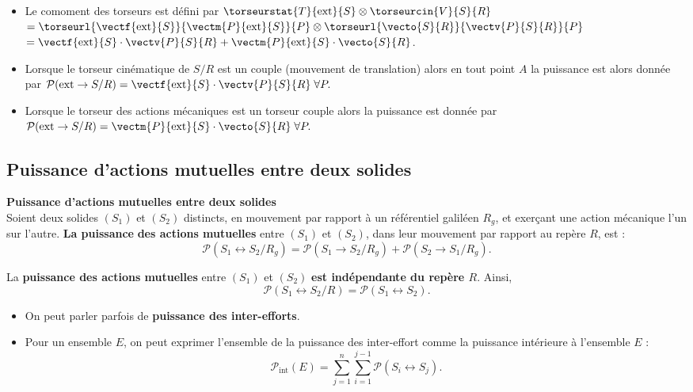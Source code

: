 \begin{rem}%
\begin{itemize}
\item Le comoment des torseurs est défini par 
$\torseurstat{T}{\text{ext}}{S}\otimes \torseurcin{V}{S}{R}$
$=
\torseurl{\vectf{\text{ext}}{S}}{\vectm{P}{\text{ext}}{S}}{P}
\otimes \torseurl{\vecto{S}{R}}{\vectv{P}{S}{R}}{P}$ 
$=\vectf{\text{ext}}{S}\cdot \vectv{P}{S}{R}+ \vectm{P}{\text{ext}}{S}\cdot\vecto{S}{R}$.

\item Lorsque le torseur cinématique de $S/R$ est un couple (mouvement de translation) alors en tout point $A$ la puissance est alors donnée par
$
\mathcal{P}(\text{ext} \rightarrow S/R)=\vectf{\text{ext}}{S}\cdot \vectv{P}{S}{R} \;
\forall P.
$

\item Lorsque le torseur des actions mécaniques est un torseur couple alors la puissance est donnée par
$
\mathcal{P}(\text{ext} \rightarrow S/R)=\vectm{P}{\text{ext}}{S}\cdot\vecto{S}{R}\;
\forall P.
$

\end{itemize}
\end{rem}%




\subsection{Puissance d'actions mutuelles entre deux solides}


\begin{defi}\textbf{Puissance d'actions mutuelles entre deux solides}\\
Soient deux solides $(S_1)$ et $(S_2)$ distincts, en mouvement par rapport à un référentiel galiléen $R_g$, et exerçant une action mécanique l'un sur l'autre.
\textbf{La puissance} \textbf{des actions mutuelles} entre $(S_1)$ et $(S_2)$, dans leur mouvement par rapport au repère $R$, est :
$$
\mathcal{P}(S_1 \leftrightarrow S_2/R_g)=\mathcal{P}(S_1 \rightarrow S_2/R_g)+\mathcal{P}(S_2 \rightarrow S_1/R_g).
$$		
 

La \textbf{puissance des actions mutuelles} entre $(S_1)$ et $(S_2)$ \textbf{est indépendante du repère $R$}.
Ainsi,
$$\mathcal{P}(S_1 \leftrightarrow S_2/R)=\mathcal{P}(S_1 \leftrightarrow S_2).
$$
\end{defi}


\begin{rem}%
\begin{itemize}
\item On peut parler parfois de \textbf{puissance des inter-efforts}.
\item Pour un ensemble $E$, on peut exprimer l'ensemble de la puissance des inter-effort comme la puissance intérieure à l'ensemble $E$ : 
$$
\mathcal{P}_{\text{int}}(E)=\displaystyle{\sum^n_{j=1}}\displaystyle{\sum^{j-1}_{i=1}}\mathcal{P}(S_i \leftrightarrow S_j).
$$
\end{itemize}

\end{rem}%


